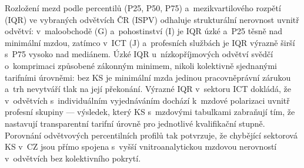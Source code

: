 Rozložení mezd podle percentilů (P25, P50, P75) a~mezikvartilového rozpětí (\ac{IQR}) ve vybraných odvětvích ČR (\ac{ISPV}) odhaluje strukturální nerovnost uvnitř odvětví: v~maloobchodě (G) a~pohostinství (I) je \ac{IQR} úzké a~P25 těsně nad minimální mzdou, zatímco v~ICT (J) a~profesních službách je \ac{IQR} výrazně širší s~P75 vysoko nad mediánem.
Úzké \ac{IQR} u~nízkopříjmových odvětví svědčí o~komprimaci způsobené zákonným minimem, nikoli kolektivně sjednanými tarifními úrovněmi: bez \ac{KS} je minimální mzda jedinou pracovněprávní zárukou a~trh nevytváří tlak na její překonání.
Výrazné \ac{IQR} v~sektoru ICT dokládá, že v~odvětvích s~individuálním vyjednáváním dochází k~mzdové polarizaci uvnitř profesní skupiny --- výsledek, který \ac{KS} s~mzdovými tabulkami zabraňují tím, že nastavují transparentní tarifní úrovně pro jednotlivé kvalifikační stupně.
Porovnání odvětvových percentilních profilů tak potvrzuje, že chybějící sektorová \ac{KS} v~CZ jsou přímo spojena s~vyšší vnitroanalytickou mzdovou nerovností v~odvětvích bez kolektivního pokrytí.


